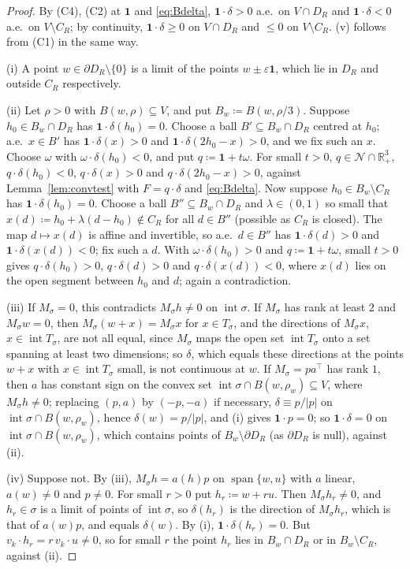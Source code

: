 \documentclass[11pt]{article}
\newcommand{\R}{\mathbb{R}}
\newcommand{\one}{\mathbf{1}}
\DeclareMathOperator{\inter}{int}
\DeclareMathOperator{\spn}{span}
\theoremstyle{plain}
\theoremstyle{definition}
\theoremstyle{remark}
\begin{document}
\begin{proof}
By (C4), (C2) at $\one$ and \eqref{eq:Bdelta}, $\one\cdot\delta>0$ a.e.\ on $V\cap D_R$ and
$\one\cdot\delta<0$ a.e.\ on $V\setminus C_R$; by continuity, $\one\cdot\delta\ge0$ on
$V\cap D_R$ and $\le0$ on $V\setminus C_R$. (v) follows from (C1) in the same way.

(i) A point $w\in\partial D_R\setminus\{0\}$ is a limit of the points $w\pm\varepsilon\one$,
which lie in $D_R$ and outside $C_R$ respectively.

(ii) Let $\rho>0$ with $B(w,\rho)\subseteq V$, and put $B_w\coloneqq B(w,\rho/3)$. Suppose
$h_0\in B_w\cap D_R$ has $\one\cdot\delta(h_0)=0$. Choose a ball $B'\subseteq B_w\cap D_R$
centred at $h_0$; a.e.\ $x\in B'$ has $\one\cdot\delta(x)>0$ and $\one\cdot\delta(2h_0-x)
>0$, and we fix such an $x$. Choose $\omega$ with $\omega\cdot\delta(h_0)<0$, and put
$q\coloneqq\one+t\omega$. For small $t>0$, $q\in\mathcal N\cap\R^3_+$, $q\cdot\delta(h_0)
<0$, $q\cdot\delta(x)>0$ and $q\cdot\delta(2h_0-x)>0$, against Lemma~\ref{lem:convtest}
with $F=q\cdot\delta$ and \eqref{eq:Bdelta}. Now suppose $h_0\in B_w\setminus C_R$ has
$\one\cdot\delta(h_0)=0$. Choose a ball $B''\subseteq B_w\cap D_R$ and $\lambda\in(0,1)$
so small that $x(d)\coloneqq h_0+\lambda(d-h_0)\notin C_R$ for all $d\in B''$ (possible as
$C_R$ is closed). The map $d\mapsto x(d)$ is affine and invertible, so a.e.\ $d\in B''$ has
$\one\cdot\delta(d)>0$ and $\one\cdot\delta(x(d))<0$; fix such a $d$. With $\omega\cdot
\delta(h_0)>0$ and $q\coloneqq\one+t\omega$, small $t>0$ gives $q\cdot\delta(h_0)>0$,
$q\cdot\delta(d)>0$ and $q\cdot\delta(x(d))<0$, where $x(d)$ lies on the open segment
between $h_0$ and $d$; again a contradiction.

(iii) If $M_\sigma=0$, this contradicts $M_\sigma h\ne0$ on $\inter\sigma$. If $M_\sigma$
has rank at least $2$ and $M_\sigma w=0$, then $M_\sigma(w+x)=M_\sigma x$ for $x\in
T_\sigma$, and the directions of $M_\sigma x$, $x\in\inter T_\sigma$, are not all equal,
since $M_\sigma$ maps the open set $\inter T_\sigma$ onto a set spanning at least two
dimensions; so $\delta$, which equals these directions at the points $w+x$ with
$x\in\inter T_\sigma$ small, is not continuous at $w$. If $M_\sigma=pa^\top$ has rank $1$,
then $a$ has constant sign on the convex set $\inter\sigma\cap B(w,\rho_w)\subseteq V$,
where $M_\sigma h\ne0$; replacing $(p,a)$ by $(-p,-a)$ if necessary, $\delta\equiv p/|p|$
on $\inter\sigma\cap B(w,\rho_w)$, hence $\delta(w)=p/|p|$, and (i) gives $\one\cdot
p=0$; so $\one\cdot\delta=0$ on $\inter\sigma\cap B(w,\rho_w)$, which contains points of
$B_w\setminus\partial D_R$ (as $\partial D_R$ is null), against (ii).

(iv) Suppose not. By (iii), $M_\sigma h=a(h)p$ on $\spn\{w,u\}$ with $a$ linear,
$a(w)\ne0$ and $p\ne0$. For small $r>0$ put $h_r\coloneqq w+ru$. Then $M_\sigma h_r\ne0$,
and $h_r\in\sigma$ is a limit of points of $\inter\sigma$, so $\delta(h_r)$ is the
direction of $M_\sigma h_r$, which is that of $a(w)p$, and equals $\delta(w)$. By (i),
$\one\cdot\delta(h_r)=0$. But $v_k\cdot h_r=r\,v_k\cdot u\ne0$, so for small $r$ the
point $h_r$ lies in $B_w\cap D_R$ or in $B_w\setminus C_R$, against (ii).
\end{proof}
\end{document}
